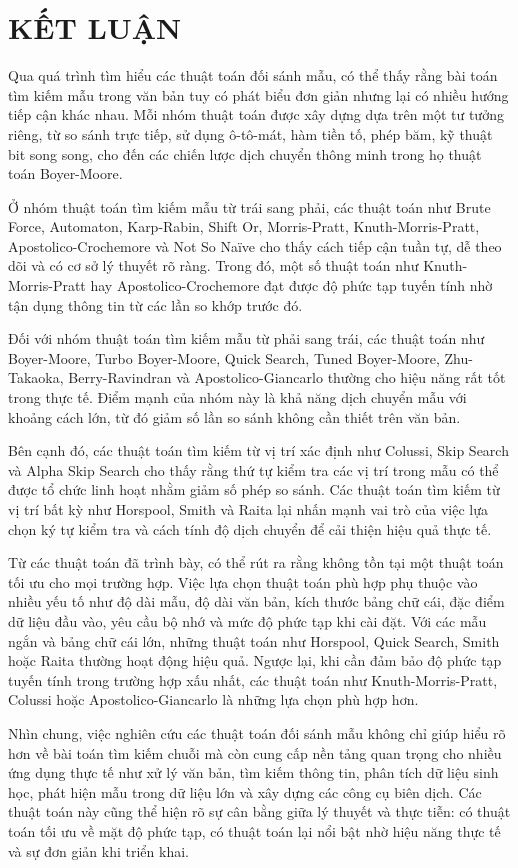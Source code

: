 \chapter{KẾT LUẬN}

Qua quá trình tìm hiểu các thuật toán đối sánh mẫu, có thể thấy rằng bài toán tìm kiếm mẫu trong văn bản tuy có phát biểu đơn giản nhưng lại có nhiều hướng tiếp cận khác nhau. Mỗi nhóm thuật toán được xây dựng dựa trên một tư tưởng riêng, từ so sánh trực tiếp, sử dụng ô-tô-mát, hàm tiền tố, phép băm, kỹ thuật bit song song, cho đến các chiến lược dịch chuyển thông minh trong họ thuật toán Boyer-Moore.

Ở nhóm thuật toán tìm kiếm mẫu từ trái sang phải, các thuật toán như Brute Force, Automaton, Karp-Rabin, Shift Or, Morris-Pratt, Knuth-Morris-Pratt, Apostolico-Crochemore và Not So Naïve cho thấy cách tiếp cận tuần tự, dễ theo dõi và có cơ sở lý thuyết rõ ràng. Trong đó, một số thuật toán như Knuth-Morris-Pratt hay Apostolico-Crochemore đạt được độ phức tạp tuyến tính nhờ tận dụng thông tin từ các lần so khớp trước đó.

Đối với nhóm thuật toán tìm kiếm mẫu từ phải sang trái, các thuật toán như Boyer-Moore, Turbo Boyer-Moore, Quick Search, Tuned Boyer-Moore, Zhu-Takaoka, Berry-Ravindran và Apostolico-Giancarlo thường cho hiệu năng rất tốt trong thực tế. Điểm mạnh của nhóm này là khả năng dịch chuyển mẫu với khoảng cách lớn, từ đó giảm số lần so sánh không cần thiết trên văn bản.

Bên cạnh đó, các thuật toán tìm kiếm từ vị trí xác định như Colussi, Skip Search và Alpha Skip Search cho thấy rằng thứ tự kiểm tra các vị trí trong mẫu có thể được tổ chức linh hoạt nhằm giảm số phép so sánh. Các thuật toán tìm kiếm từ vị trí bất kỳ như Horspool, Smith và Raita lại nhấn mạnh vai trò của việc lựa chọn ký tự kiểm tra và cách tính độ dịch chuyển để cải thiện hiệu quả thực tế.

Từ các thuật toán đã trình bày, có thể rút ra rằng không tồn tại một thuật toán tối ưu cho mọi trường hợp. Việc lựa chọn thuật toán phù hợp phụ thuộc vào nhiều yếu tố như độ dài mẫu, độ dài văn bản, kích thước bảng chữ cái, đặc điểm dữ liệu đầu vào, yêu cầu bộ nhớ và mức độ phức tạp khi cài đặt. Với các mẫu ngắn và bảng chữ cái lớn, những thuật toán như Horspool, Quick Search, Smith hoặc Raita thường hoạt động hiệu quả. Ngược lại, khi cần đảm bảo độ phức tạp tuyến tính trong trường hợp xấu nhất, các thuật toán như Knuth-Morris-Pratt, Colussi hoặc Apostolico-Giancarlo là những lựa chọn phù hợp hơn.

Nhìn chung, việc nghiên cứu các thuật toán đối sánh mẫu không chỉ giúp hiểu rõ hơn về bài toán tìm kiếm chuỗi mà còn cung cấp nền tảng quan trọng cho nhiều ứng dụng thực tế như xử lý văn bản, tìm kiếm thông tin, phân tích dữ liệu sinh học, phát hiện mẫu trong dữ liệu lớn và xây dựng các công cụ biên dịch. Các thuật toán này cũng thể hiện rõ sự cân bằng giữa lý thuyết và thực tiễn: có thuật toán tối ưu về mặt độ phức tạp, có thuật toán lại nổi bật nhờ hiệu năng thực tế và sự đơn giản khi triển khai.